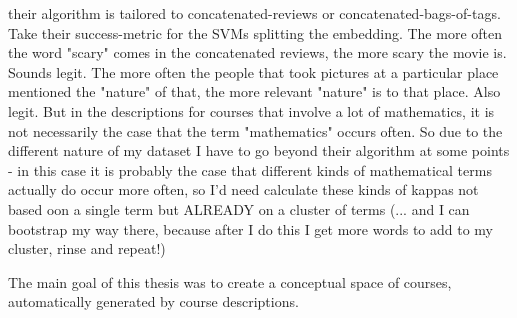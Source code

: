 \documentclass[11pt,
  paper=a4, 
  twoside,  %
  hidelinks,
  bibliography=totocnumbered,
	captions=tableheading,
	BCOR=10mm
]{scrreprt}
\theoremstyle{definition}
\begin{document}
their algorithm is tailored to concatenated-reviews or concatenated-bags-of-tags. Take their success-metric for the SVMs splitting the embedding. The more often the word "scary" comes in the concatenated reviews, the more scary the movie is. Sounds legit. The more often the people that took pictures at a particular place mentioned the "nature" of that, the more relevant "nature" is to that place. Also legit. But in the descriptions for courses that involve a lot of mathematics, it is not necessarily the case that the term "mathematics" occurs often. So due to the different nature of my dataset I have to go beyond their algorithm at some points - in this case it is probably the case that different kinds of mathematical terms actually do occur more often, so I'd need calculate these kinds of kappas not based oon a single term but ALREADY on a cluster of terms (... and I can bootstrap my way there, because after I do this I get more words to add to my cluster, rinse and repeat!)






The main goal of this thesis was to create a conceptual space of courses, automatically generated by course descriptions.
\end{document}
